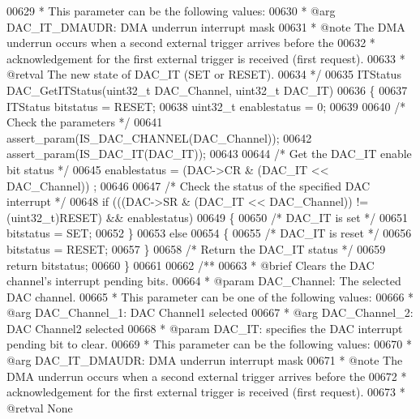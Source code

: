 \begin{DoxyCode}
00629 \textcolor{comment}{  *          This parameter can be the following values:}
00630 \textcolor{comment}{  *            @arg DAC\_IT\_DMAUDR: DMA underrun interrupt mask}
00631 \textcolor{comment}{  * @note   The DMA underrun occurs when a second external trigger arrives before the }
00632 \textcolor{comment}{  *         acknowledgement for the first external trigger is received (first request).}
00633 \textcolor{comment}{  * @retval The new state of DAC\_IT (SET or RESET).}
00634 \textcolor{comment}{  */}
00635 ITStatus DAC_GetITStatus(uint32\_t DAC\_Channel, uint32\_t DAC\_IT)
00636 \{
00637   ITStatus bitstatus = RESET;
00638   uint32\_t enablestatus = 0;
00639 
00640   \textcolor{comment}{/* Check the parameters */}
00641   assert_param(IS\_DAC\_CHANNEL(DAC\_Channel));
00642   assert_param(IS\_DAC\_IT(DAC\_IT));
00643 
00644   \textcolor{comment}{/* Get the DAC\_IT enable bit status */}
00645   enablestatus = (DAC->CR & (DAC\_IT << DAC\_Channel)) ;
00646 
00647   \textcolor{comment}{/* Check the status of the specified DAC interrupt */}
00648   \textcolor{keywordflow}{if} (((DAC->SR & (DAC\_IT << DAC\_Channel)) != (uint32\_t)RESET) && enablestatus)
00649   \{
00650     \textcolor{comment}{/* DAC\_IT is set */}
00651     bitstatus = SET;
00652   \}
00653   \textcolor{keywordflow}{else}
00654   \{
00655     \textcolor{comment}{/* DAC\_IT is reset */}
00656     bitstatus = RESET;
00657   \}
00658   \textcolor{comment}{/* Return the DAC\_IT status */}
00659   \textcolor{keywordflow}{return}  bitstatus;
00660 \}
00661 
00662 \textcolor{comment}{/**}
00663 \textcolor{comment}{  * @brief  Clears the DAC channel's interrupt pending bits.}
00664 \textcolor{comment}{  * @param  DAC\_Channel: The selected DAC channel. }
00665 \textcolor{comment}{  *          This parameter can be one of the following values:}
00666 \textcolor{comment}{  *            @arg DAC\_Channel\_1: DAC Channel1 selected}
00667 \textcolor{comment}{  *            @arg DAC\_Channel\_2: DAC Channel2 selected}
00668 \textcolor{comment}{  * @param  DAC\_IT: specifies the DAC interrupt pending bit to clear.}
00669 \textcolor{comment}{  *          This parameter can be the following values:}
00670 \textcolor{comment}{  *            @arg DAC\_IT\_DMAUDR: DMA underrun interrupt mask                         }
00671 \textcolor{comment}{  * @note   The DMA underrun occurs when a second external trigger arrives before the }
00672 \textcolor{comment}{  *         acknowledgement for the first external trigger is received (first request).               
                  }
00673 \textcolor{comment}{  * @retval None}

\end{DoxyCode}
